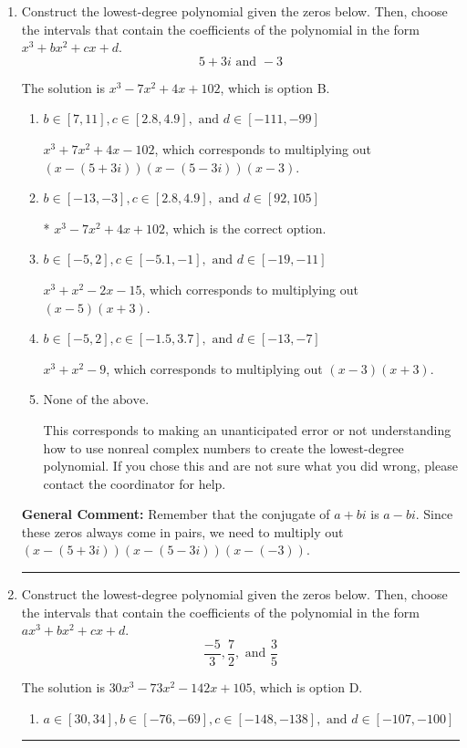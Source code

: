 \documentclass{extbook}[14pt]
\newcommand{\litem}[1]{\item #1

\rule{\textwidth}{0.4pt}}
\begin{document}
\begin{enumerate}\litem{
Construct the lowest-degree polynomial given the zeros below. Then, choose the intervals that contain the coefficients of the polynomial in the form $x^3+bx^2+cx+d$.
\[ 5 + 3 i \text{ and } -3 \]

The solution is \( x^{3} -7 x^{2} +4 x + 102 \), which is option B.\begin{enumerate}[label=\Alph*.]
\item \( b \in [7, 11], c \in [2.8, 4.9], \text{ and } d \in [-111, -99] \)

$x^{3} +7 x^{2} +4 x -102$, which corresponds to multiplying out $(x-(5 + 3 i))(x-(5 - 3 i))(x -3)$.
\item \( b \in [-13, -3], c \in [2.8, 4.9], \text{ and } d \in [92, 105] \)

* $x^{3} -7 x^{2} +4 x + 102$, which is the correct option.
\item \( b \in [-5, 2], c \in [-5.1, -1], \text{ and } d \in [-19, -11] \)

$x^{3} + x^{2} -2 x -15$, which corresponds to multiplying out $(x -5)(x + 3)$.
\item \( b \in [-5, 2], c \in [-1.5, 3.7], \text{ and } d \in [-13, -7] \)

$x^{3} + x^{2} -9$, which corresponds to multiplying out $(x -3)(x + 3)$.
\item \( \text{None of the above.} \)

This corresponds to making an unanticipated error or not understanding how to use nonreal complex numbers to create the lowest-degree polynomial. If you chose this and are not sure what you did wrong, please contact the coordinator for help.
\end{enumerate}

\textbf{General Comment:} Remember that the conjugate of $a+bi$ is $a-bi$. Since these zeros always come in pairs, we need to multiply out $(x-(5 + 3 i))(x-(5 - 3 i))(x-(-3))$.
}
\litem{
Construct the lowest-degree polynomial given the zeros below. Then, choose the intervals that contain the coefficients of the polynomial in the form $ax^3+bx^2+cx+d$.
\[ \frac{-5}{3}, \frac{7}{2}, \text{ and } \frac{3}{5} \]

The solution is \( 30x^{3} -73 x^{2} -142 x + 105 \), which is option D.\begin{enumerate}[label=\Alph*.]
\item \( a \in [30, 34], b \in [-76, -69], c \in [-148, -138], \text{ and } d \in [-107, -100] \)


\end{enumerate}}
\end{enumerate}
\end{document}
